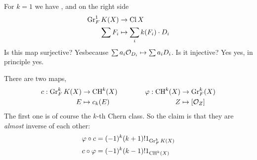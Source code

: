 For $k=1$ we have , and on the right side 
\begin{align*}
	\operatorname{Gr}^1_FK(X)&\to\operatorname{Cl} X\\
	\sum F_i&\mapsto\sum_ik(F_i)\cdot D_i
\end{align*}
Is this map surjective? Yesbecause $\sum a_i\mathcal{O}_{D_i}\mapsto\sum a_iD_i$. Is it injective? Yes yes, in principle yes.
\begin{claim}
	There are two maps,
	\begin{align*}
		\begin{aligned}
			c:\operatorname{Gr}^k_FK(X)&\to\operatorname{CH}^k(X)\\
			E&\mapsto c_k(E)
		\end{aligned}\qquad\qquad
		\begin{aligned}
			\varphi:\operatorname{CH}^k(X)&\to\operatorname{Gr}_F^k(X)\\
			Z&\mapsto[\mathcal{O}_Z]
		\end{aligned}
	\end{align*}
	The first one is of course the $k$-th Chern class. So the claim is that they are \textit{almost} inverse of each other:
	\begin{align*}
		\varphi\circ c&=(-1)^k(k+1)!1_{\operatorname{Gr}^k_FK(X)}\\
		c\circ\varphi&=(-1)^k(k-1)!1_{\operatorname{CH}^k(X)}
	\end{align*}
\end{claim}

